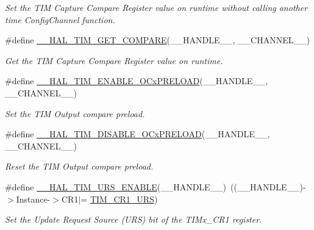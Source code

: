 \begin{DoxyCompactItemize}
\begin{DoxyCompactList}\small\item\em Set the T\+IM Capture Compare Register value on runtime without calling another time Config\+Channel function. \end{DoxyCompactList}\item 
\#define \hyperlink{group___t_i_m___exported___macros_gaa40722f56910966e1da5241b610eed84}{\+\_\+\+\_\+\+H\+A\+L\+\_\+\+T\+I\+M\+\_\+\+G\+E\+T\+\_\+\+C\+O\+M\+P\+A\+RE}(\+\_\+\+\_\+\+H\+A\+N\+D\+L\+E\+\_\+\+\_\+,  \+\_\+\+\_\+\+C\+H\+A\+N\+N\+E\+L\+\_\+\+\_\+)
\begin{DoxyCompactList}\small\item\em Get the T\+IM Capture Compare Register value on runtime. \end{DoxyCompactList}\item 
\#define \hyperlink{group___t_i_m___exported___macros_ga199e848f0a301987a500faea0db2dd70}{\+\_\+\+\_\+\+H\+A\+L\+\_\+\+T\+I\+M\+\_\+\+E\+N\+A\+B\+L\+E\+\_\+\+O\+Cx\+P\+R\+E\+L\+O\+AD}(\+\_\+\+\_\+\+H\+A\+N\+D\+L\+E\+\_\+\+\_\+,  \+\_\+\+\_\+\+C\+H\+A\+N\+N\+E\+L\+\_\+\+\_\+)
\begin{DoxyCompactList}\small\item\em Set the T\+IM Output compare preload. \end{DoxyCompactList}\item 
\#define \hyperlink{group___t_i_m___exported___macros_ga3e0ec4eb797b54c408a3be067f41a2f8}{\+\_\+\+\_\+\+H\+A\+L\+\_\+\+T\+I\+M\+\_\+\+D\+I\+S\+A\+B\+L\+E\+\_\+\+O\+Cx\+P\+R\+E\+L\+O\+AD}(\+\_\+\+\_\+\+H\+A\+N\+D\+L\+E\+\_\+\+\_\+,  \+\_\+\+\_\+\+C\+H\+A\+N\+N\+E\+L\+\_\+\+\_\+)
\begin{DoxyCompactList}\small\item\em Reset the T\+IM Output compare preload. \end{DoxyCompactList}\item 
\#define \hyperlink{group___t_i_m___exported___macros_ga3b06856bd6d7e10cfff342b1726db51d}{\+\_\+\+\_\+\+H\+A\+L\+\_\+\+T\+I\+M\+\_\+\+U\+R\+S\+\_\+\+E\+N\+A\+B\+LE}(\+\_\+\+\_\+\+H\+A\+N\+D\+L\+E\+\_\+\+\_\+)~((\+\_\+\+\_\+\+H\+A\+N\+D\+L\+E\+\_\+\+\_\+)-\/$>$Instance-\/$>$C\+R1$\vert$= \hyperlink{group___peripheral___registers___bits___definition_ga06c997c2c23e8bef7ca07579762c113b}{T\+I\+M\+\_\+\+C\+R1\+\_\+\+U\+RS})
\begin{DoxyCompactList}\small\item\em Set the Update Request Source (U\+RS) bit of the T\+I\+Mx\+\_\+\+C\+R1 register. \end{DoxyCompactList}\item 

\end{DoxyCompactItemize}
